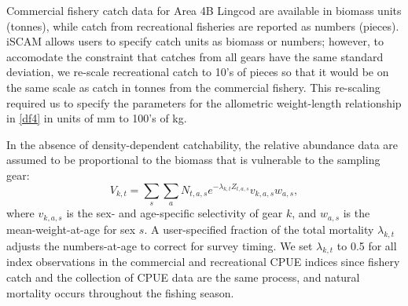 \documentclass[11pt]{article}   %
\def\headc{\vspace{-1ex}} %
\def\subsub#1{\noindent {\bf #1} \headc}    %
\begin{document}
Commercial fishery catch data for Area 4B Lingcod are available in biomass units (tonnes), while catch from recreational fisheries are reported as numbers (pieces).  iSCAM allows users to specify catch units as biomass or numbers; however, to accomodate the constraint that catches from all gears have the same standard deviation, we re-scale recreational catch to 10's of pieces so that it would be on the same scale as catch in tonnes from the commercial fishery.  This re-scaling required us to specify the parameters for the allometric weight-length relationship in \eqref{df4} in units of mm to 100's of kg.

\subsub{Relative Abundance Data}

In the absence of density-dependent catchability, the relative abundance data are assumed to be proportional to the biomass that is vulnerable to the sampling gear:
\begin{equation}\label{df29}
 V_{k,t} = \sum_s \sum_a N_{t,a,s} e^{-\lambda_{k,t} Z_{t,a,s}} v_{k,a,s} w_{a,s},
\end{equation}
where $v_{k,a,s}$ is the sex- and age-specific selectivity of gear $k$, and $w_{a,s}$ is the mean-weight-at-age for sex $s$.  A user-specified fraction of the total mortality $\lambda_{k,t}$ adjusts the numbers-at-age to correct for survey timing.  We set $\lambda_{k,t}$ to 0.5 for all index observations in the commercial and recreational CPUE indices since fishery catch and the collection of CPUE data are the same process, and natural mortality occurs throughout the fishing season. 
\end{document}
